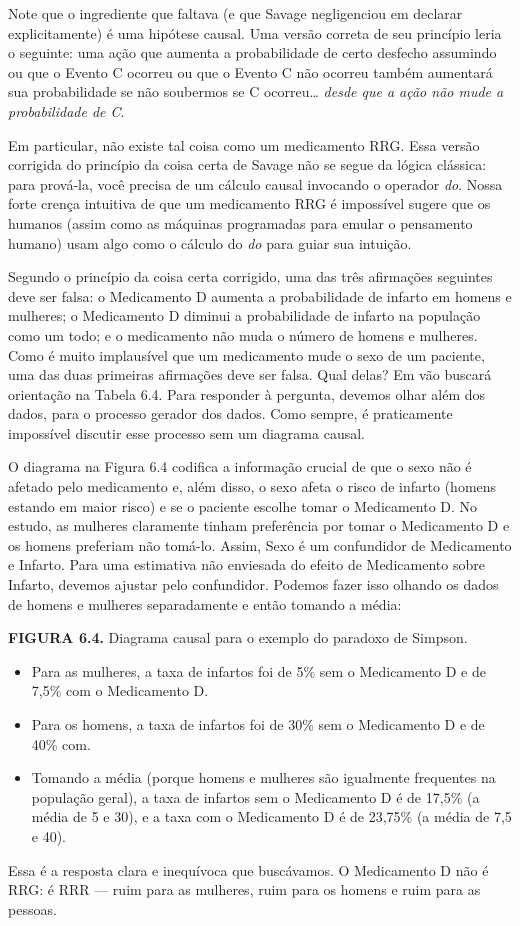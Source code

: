 \documentclass[11pt,a5paper,twoside]{book}
\begin{document}
Note que o ingrediente que faltava (e que Savage negligenciou em declarar explicitamente) é uma hipótese causal. Uma versão correta de seu princípio leria o seguinte: uma ação que aumenta a probabilidade de certo desfecho assumindo ou que o Evento C ocorreu ou que o Evento C não ocorreu também aumentará sua probabilidade se não soubermos se C ocorreu… \textit{desde que a ação não mude a probabilidade de C}.

Em particular, não existe tal coisa como um medicamento RRG. Essa versão corrigida do princípio da coisa certa de Savage não se segue da lógica clássica: para prová-la, você precisa de um cálculo causal invocando o operador \textit{do}. Nossa forte crença intuitiva de que um medicamento RRG é impossível sugere que os humanos (assim como as máquinas programadas para emular o pensamento humano) usam algo como o cálculo do \textit{do} para guiar sua intuição.

Segundo o princípio da coisa certa corrigido, uma das três afirmações seguintes deve ser falsa: o Medicamento D aumenta a probabilidade de infarto em homens e mulheres; o Medicamento D diminui a probabilidade de infarto na população como um todo; e o medicamento não muda o número de homens e mulheres. Como é muito implausível que um medicamento mude o sexo de um paciente, uma das duas primeiras afirmações deve ser falsa. Qual delas? Em vão buscará orientação na Tabela 6.4. Para responder à pergunta, devemos olhar além dos dados, para o processo gerador dos dados. Como sempre, é praticamente impossível discutir esse processo sem um diagrama causal.

O diagrama na Figura 6.4 codifica a informação crucial de que o sexo não é afetado pelo medicamento e, além disso, o sexo afeta o risco de infarto (homens estando em maior risco) e se o paciente escolhe tomar o Medicamento D. No estudo, as mulheres claramente tinham preferência por tomar o Medicamento D e os homens preferiam não tomá-lo. Assim, Sexo é um confundidor de Medicamento e Infarto. Para uma estimativa não enviesada do efeito de Medicamento sobre Infarto, devemos ajustar pelo confundidor. Podemos fazer isso olhando os dados de homens e mulheres separadamente e então tomando a média:

\textbf{FIGURA 6.4.} Diagrama causal para o exemplo do paradoxo de Simpson.

\begin{itemize}
\item Para as mulheres, a taxa de infartos foi de 5\% sem o Medicamento D e de 7,5\% com o Medicamento D.
\item Para os homens, a taxa de infartos foi de 30\% sem o Medicamento D e de 40\% com.
\item Tomando a média (porque homens e mulheres são igualmente frequentes na população geral), a taxa de infartos sem o Medicamento D é de 17,5\% (a média de 5 e 30), e a taxa com o Medicamento D é de 23,75\% (a média de 7,5 e 40).
\end{itemize}
Essa é a resposta clara e inequívoca que buscávamos. O Medicamento D não é RRG: é RRR — ruim para as mulheres, ruim para os homens e ruim para as pessoas.
\end{document}
